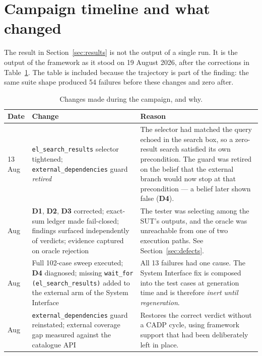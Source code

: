 \documentclass[11pt,a4paper]{article}
\newcommand{\gate}[1]{\texttt{\small #1}}
\newcommand{\dref}[1]{\textbf{D#1}}
\begin{document}
\section{Campaign timeline and what changed}

The result in Section~\ref{sec:results} is not the output of a single run. It is
the output of the framework as it stood on 19 August 2026, after the corrections
in Table~\ref{tab:timeline}. The table is included because the trajectory is part
of the finding: the same suite shape produced 54 failures before these changes and
zero after.

\begin{table}[h]
\centering
\caption{Changes made during the campaign, and why.}
\label{tab:timeline}
\footnotesize
\begin{tabular}{@{}p{1.9cm} p{5.1cm} p{8.4cm}@{}}
\toprule
\textbf{Date} & \textbf{Change} & \textbf{Reason} \\
\midrule
13 Aug & \gate{el\_search\_results} selector tightened; \texttt{external\_dependencies}
guard \emph{retired} &
The selector had matched the query echoed in the search box, so a zero-result
search satisfied its own precondition. The guard was retired on the belief that the
external branch would now stop at that precondition --- a belief later shown false
(\dref{4}). \\
\addlinespace
17 Aug & \dref{1}, \dref{2}, \dref{3} corrected; exact-sum ledger made
fail-closed; findings surfaced independently of verdicts; evidence captured on
oracle rejection &
The tester was selecting among the SUT's outputs, and the oracle was unreachable
from one of two execution paths. See Section~\ref{sec:defects}. \\
\addlinespace
18 Aug & Full 102-case sweep executed; \dref{4} diagnosed; missing
\gate{wait\_for (el\_search\_results)} added to the external arm of the System
Interface &
All 13 failures had one cause. The System Interface fix is composed into the test
cases at generation time and is therefore \emph{inert until regeneration}. \\
\addlinespace
19 Aug & \texttt{external\_dependencies} guard reinstated;
external coverage gap measured against the catalogue API &
Restores the correct verdict without a CADP cycle, using framework support that had
been deliberately left in place. \\
\bottomrule
\end{tabular}
\end{table}
\end{document}
